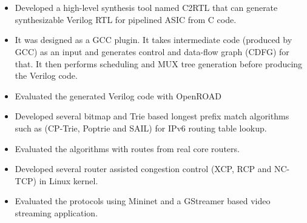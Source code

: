 \documentclass[10pt,a4paper,ragged2e]{altacv}
\begin{document}
\\
\\







\begin{itemize}
	\item Developed a high-level synthesis tool named C2RTL that can generate synthesizable Verilog RTL for pipelined ASIC from C code.
	\item It was designed as a GCC plugin. It takes intermediate code (produced by GCC) as an input and generates control and data-flow graph (CDFG) for that. It then performs scheduling and MUX tree generation before producing the Verilog code.
	\item Evaluated the generated Verilog code with OpenROAD 
\end{itemize}
\smallskip
{}
\begin{itemize}
	\item Developed several bitmap and Trie based longest prefix match algorithms such as (CP-Trie, Poptrie and SAIL) for IPv6 routing table lookup. 
	\item Evaluated the algorithms with routes from real core routers.
\end{itemize}
\smallskip
{}
\begin{itemize}
	\item Developed several router assisted congestion control (XCP, RCP and NC-TCP)  in Linux kernel.
	\item Evaluated the protocols using Mininet and a GStreamer based video streaming application. 
\end{itemize}
\end{document}
